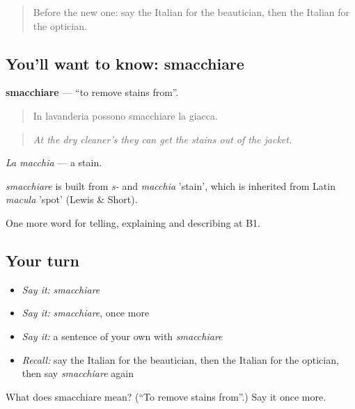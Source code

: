 \label{lesson:IT-C456-smacchiare}



\begin{quote}
Before the new one: say the Italian for the beautician, then the Italian for the optician.
\end{quote}

\subsection*{You'll want to know: smacchiare}
\textbf{smacchiare} — \textquotedblleft{}to remove stains from\textquotedblright{}.

\begin{quote}
In lavanderia possono smacchiare la giacca.
\end{quote}

\begin{quote}
\emph{At the dry cleaner's they can get the stains out of the jacket.}
\end{quote}

\emph{La macchia} — a stain.

\begin{cousinweb}
\emph{smacchiare} is built from \emph{s-} and \emph{macchia} 'stain', which is inherited from Latin \emph{macula} 'spot' (Lewis \& Short).
\end{cousinweb}

\begin{grammarlens}[title={What you've built}]
One more word for telling, explaining and describing at B1.
\end{grammarlens}

\subsection*{Your turn}
\begin{itemize}
\raggedright
  \item \emph{Say it:} \emph{smacchiare}
  \item \emph{Say it:} \emph{smacchiare}, once more
  \item \emph{Say it:} a sentence of your own with \emph{smacchiare}
  \item \emph{Recall:} say the Italian for the beautician, then the Italian for the optician, then say \emph{smacchiare} again
\end{itemize}

\begin{tcolorbox}[breakable,colback=teal!4,colframe=teal!35!black,title={Before you move on}]
What does smacchiare mean? (\textquotedblleft{}To remove stains from\textquotedblright{}.) Say it once more.
\end{tcolorbox}
